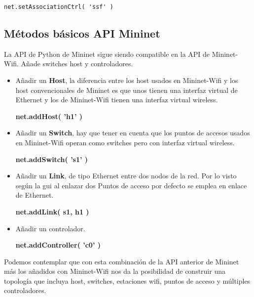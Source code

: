 \begin{verbatim}
net.setAssociationCtrl( 'ssf' )
\end{verbatim}

\subsection{Métodos básicos API Mininet }

La API de Python de Mininet sigue siendo compatible en la API de Mininet-Wifi. Añade switches host y controladores.\newline
\newline

\begin{itemize}
    \item Añadir un \textbf{Host}, la diferencia entre los host usados en Mininet-Wifi y los host convencionales de Mininet es que unos tienen una interfaz virtual de Ethernet y los de Mininet-Wifi tienen una interfaz virtual wireless.
    \begin{center}
        \textbf{net.addHost( 'h1' )}
    \end{center}
    \item Añadir un \textbf{Switch}, hay que tener en cuenta que los puntos de accesos usados en Mininet-Wifi operan como switches pero con interfaz virtual wireless. 
    \begin{center}
        \textbf{net.addSwitch( 's1' )}
    \end{center}
    \item Añadir un \textbf{Link}, de tipo Ethernet entre dos nodos de la red. Por lo visto según la gui al enlazar dos Puntos de acceso por defecto se emplea en enlace de Ethernet.
    \begin{center}
        \textbf{net.addLink( s1, h1 )}
    \end{center}
    \item  Añadir un controlador.
        \begin{center}
        \textbf{net.addController( 'c0' )}
    \end{center}
\end{itemize}
Podemos contemplar que con esta combinación de la API anterior de Mininet más los añadidos con Mininet-Wifi nos da la posibilidad de construir una topología que incluya host, switches, estaciones wifi, puntos de acceso y múltiples controladores. 
\newpage
